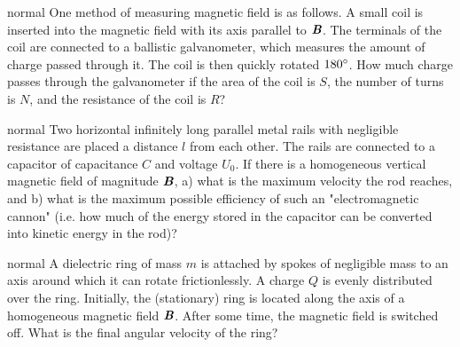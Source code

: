 \hypertarget{P135}{}
\begin{solution}{normal} %
One method of measuring magnetic field is as follows. A small coil is inserted into the magnetic field with its axis parallel to $\textbf{\textit{B}}$. The terminals of the coil are connected to a ballistic galvanometer, which measures the amount of charge passed through it. The coil is then quickly rotated $180\degree$. How much charge passes through the galvanometer if the area of the coil is $S$, the number of turns is $N$, and the resistance of the coil is $R$?
\end{solution}

\hypertarget{P136}{}
\begin{solution}{normal} %
Two horizontal infinitely long parallel metal rails with negligible resistance are placed a distance $l$ from each other. The rails are connected to a capacitor of capacitance $C$ and voltage $U_0$. If there is a homogeneous vertical magnetic field of magnitude $\textbf{\textit{B}}$, a) what is the maximum velocity the rod reaches, and b) what is the maximum possible efficiency of such an "electromagnetic cannon" (i.e. how much of the energy stored in the capacitor can be converted into kinetic energy in the rod)?
\end{solution}

\hypertarget{P137}{}
\begin{solution}{normal} %
A dielectric ring of mass $m$ is attached by spokes of negligible mass to an axis around which it can rotate frictionlessly. A charge $Q$ is evenly distributed over the ring. Initially, the (stationary) ring is located along the axis of a homogeneous magnetic field $\textbf{\textit{B}}$. After some time, the magnetic field is switched off. What is the final angular velocity of the ring?
\end{solution}

